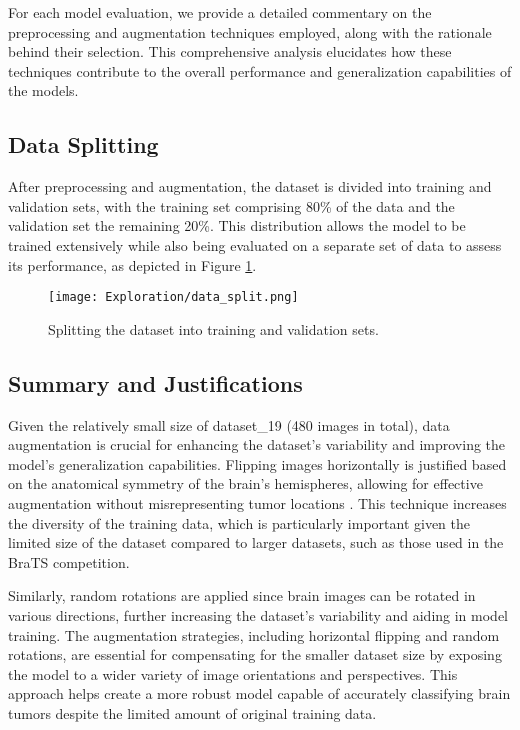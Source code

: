 For each model evaluation, we provide a detailed commentary on the preprocessing and augmentation techniques employed, along with the rationale behind their selection. This comprehensive analysis elucidates how these techniques contribute to the overall performance and generalization capabilities of the models.

\subsection{Data Splitting}\label{data_splitting}
After preprocessing and augmentation, the dataset is divided into training and validation sets, with the training set comprising 80\% of the data and the validation set the remaining 20\%. This distribution allows the model to be trained extensively while also being evaluated on a separate set of data to assess its performance, as depicted in Figure \ref{fig:data_split}.

\begin{figure}[H]
  \begin{center}
    \texttt{[image: Exploration/data\_split.png]}
  \end{center}
  \caption{Splitting the dataset into training and validation sets.}\label{fig:data_split}
\end{figure}


\subsection{Summary and Justifications}

Given the relatively small size of dataset\_19 (480 images in total), data augmentation is crucial for enhancing the dataset's variability and improving the model's generalization capabilities. Flipping images horizontally is justified based on the anatomical symmetry of the brain's hemispheres, allowing for effective augmentation without misrepresenting tumor locations \cite{nalepa_data_2019}. This technique increases the diversity of the training data, which is particularly important given the limited size of the dataset compared to larger datasets, such as those used in the BraTS competition.

Similarly, random rotations are applied since brain images can be rotated in various directions, further increasing the dataset's variability and aiding in model training. The augmentation strategies, including horizontal flipping and random rotations, are essential for compensating for the smaller dataset size by exposing the model to a wider variety of image orientations and perspectives. This approach helps create a more robust model capable of accurately classifying brain tumors despite the limited amount of original training data.

